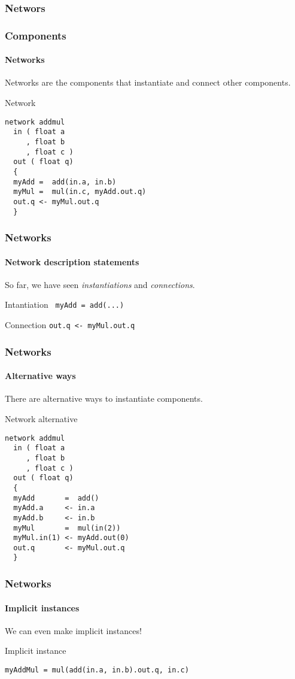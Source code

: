 \documentclass[10pt]{beamer}
\begin{document}
\subsubsection*{Networs}
\begin{frame}[fragile]
\frametitle{Components}
\framesubtitle{Networks}

Networks are the components that instantiate and connect other
components.

\pause
\begin{block}{Network}
\begin{verbatim}
network addmul
  in ( float a
     , float b
     , float c )
  out ( float q)
  {
  myAdd =  add(in.a, in.b)
  myMul =  mul(in.c, myAdd.out.q)
  out.q <- myMul.out.q
  }
\end{verbatim}
\end{block}
\end{frame}


\begin{frame}[fragile]
\frametitle{Networks}
\framesubtitle{Network description statements}

So far, we have seen \emph{instantiations} and \emph{connections}.

\pause
\begin{block}{Intantiation}
\verb| myAdd = add(...)|
\end{block}

\pause
\begin{block}{Connection}
\verb|out.q <- myMul.out.q|  
\end{block}

\end{frame}


\begin{frame}[fragile]
\frametitle{Networks}
\framesubtitle{Alternative ways}

There are alternative ways to instantiate components.

\pause
\begin{block}{Network alternative}
\begin{verbatim}
network addmul
  in ( float a
     , float b
     , float c )
  out ( float q)
  {
  myAdd       =  add()
  myAdd.a     <- in.a
  myAdd.b     <- in.b
  myMul       =  mul(in(2))
  myMul.in(1) <- myAdd.out(0)
  out.q       <- myMul.out.q
  }
\end{verbatim}
\end{block}
\end{frame}


\begin{frame}[fragile]
\frametitle{Networks}
\framesubtitle{Implicit instances}

We can even make implicit instances!

\pause
\begin{block}{Implicit instance}
\end{block}
\verb|myAddMul = mul(add(in.a, in.b).out.q, in.c)|
\end{frame}
\end{document}
